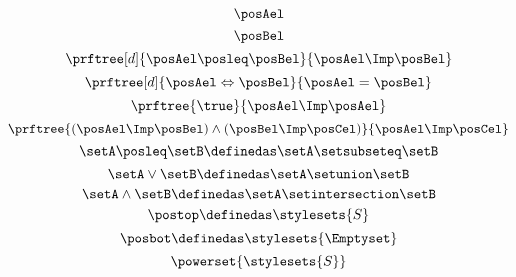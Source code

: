 {\begin{forslides}
        \begin{equation}
            \label{eq:latt_4}
            \posAel
        \end{equation}
        \begin{equation}
            \label{eq:latt_5}
            \posBel
        \end{equation}
        \begin{equation}
            \label{eq:prop_1}
            \prftree[d]{\posAel \posleq \posBel}{\posAel \Imp \posBel}
        \end{equation}
        \begin{equation}
            \label{eq:prop_2}
            \prftree[d]{\posAel \Leftrightarrow \posBel}{\posAel = \posBel}
        \end{equation}
        \begin{equation}
            \label{eq:prop_3}
            \prftree{\true}{\posAel \Imp \posAel}
        \end{equation}
        \begin{equation}
            \label{eq:prop_4}
            \prftree{(\posAel \Imp \posBel)\wedge (\posBel \Imp \posCel)}{\posAel \Imp \posCel}
        \end{equation}
        \begin{equation}
            \label{eq:pow_1}
            \setA \posleq \setB \definedas \setA \setsubseteq \setB
        \end{equation}
        \begin{equation}
            \label{eq:pow_2}
            \setA \vee \setB \definedas \setA \setunion \setB
        \end{equation}
        \begin{equation}
            \label{eq:pow_3}
            \setA \wedge \setB \definedas \setA \setintersection \setB
        \end{equation}
        \begin{equation}
            \label{eq:pow_4}
            \postop \definedas \stylesets{S}
        \end{equation}
        \begin{equation}
            \label{eq:pow_5}
            \posbot \definedas \stylesets{\Emptyset}
        \end{equation}
        \begin{equation}
            \label{eq:pow_6}
            \powerset{\stylesets{S}}
        \end{equation}

\end{forslides}}
